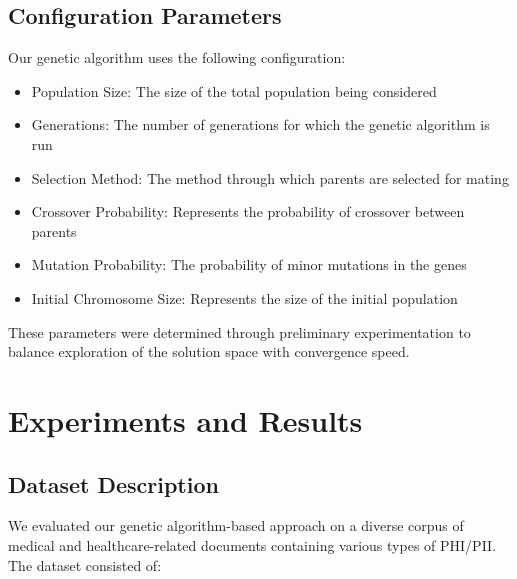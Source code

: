 \documentclass[conference]{IEEEtran}
\begin{document}
\subsection{\textbf{Configuration Parameters}}
Our genetic algorithm uses the following configuration:
\begin{itemize}
\item Population Size: The size of the total population being considered
\item Generations: The number of generations for which the genetic algorithm is run
\item Selection Method: The method through which parents are selected for mating
\item Crossover Probability: Represents the probability of crossover between parents
\item Mutation Probability: The probability of minor mutations in the genes
\item Initial Chromosome Size: Represents the size of the initial population
\end{itemize}

These parameters were determined through preliminary experimentation to balance exploration of the solution space with convergence speed.

\section{\textbf{Experiments and Results}}
\subsection{\textbf{Dataset Description}}
We evaluated our genetic algorithm-based approach on a diverse corpus of medical and healthcare-related documents containing various types of PHI/PII. The dataset consisted of:
\end{document}
